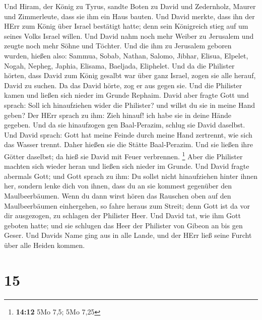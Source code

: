  Und Hiram, der König zu Tyrus, sandte Boten zu David und
Zedernholz, Maurer und Zimmerleute, dass sie ihm ein Haus bauten.
 Und David merkte, dass ihn der HErr zum König über Israel
bestätigt hatte; denn sein Königreich stieg auf um seines Volks Israel
willen.  Und David nahm noch mehr Weiber zu Jerusalem und
zeugte noch mehr Söhne und Töchter.  Und die ihm zu
Jerusalem geboren wurden, hießen also: Sammua, Sobab, Nathan, Salomo,
 Jibhar, Elisua, Elpelet,  Nogah, Nepheg,
Japhia,  Elisama, Baeljada, Eliphelet.  Und
da die Philister hörten, dass David zum König gesalbt war über ganz
Israel, zogen sie alle herauf, David zu suchen. Da das David hörte, zog
er aus gegen sie.  Und die Philister kamen und ließen sich
nieder im Grunde Rephaim.  David aber fragte Gott und
sprach: Soll ich hinaufziehen wider die Philister? und willst du sie in
meine Hand geben? Der HErr sprach zu ihm: Zieh hinauf! ich habe sie in
deine Hände gegeben.  Und da sie hinaufzogen gen
Baal-Perazim, schlug sie David daselbst. Und David sprach: Gott hat
meine Feinde durch meine Hand zertrennt, wie sich das Wasser trennt.
Daher hießen sie die Stätte Baal-Perazim.  Und sie ließen
ihre Götter daselbst; da hieß sie David mit Feuer verbrennen.
\footnote{\textbf{14:12} 5Mo 7,5; 5Mo 7,25}  Aber die
Philister machten sich wieder heran und ließen sich nieder im Grunde.
 Und David fragte abermals Gott; und Gott sprach zu ihm:
Du sollst nicht hinaufziehen hinter ihnen her, sondern lenke dich von
ihnen, dass du an sie kommest gegenüber den Maulbeerbäumen.
 Wenn du dann wirst hören das Rauschen oben auf den
Maulbeerbäumen einhergehen, so fahre heraus zum Streit; denn Gott ist da
vor dir ausgezogen, zu schlagen der Philister Heer.  Und
David tat, wie ihm Gott geboten hatte; und sie schlugen das Heer der
Philister von Gibeon an bis gen Geser.  Und Davids Name
ging aus in alle Lande, und der HErr ließ seine Furcht über alle Heiden
kommen.

\hypertarget{section-14}{%
\section{15}\label{section-14}}

